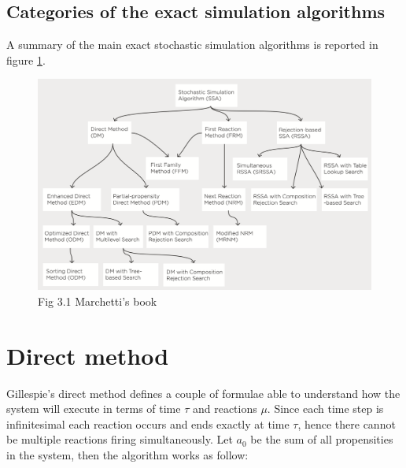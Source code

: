   \subsection{Categories of the exact simulation algorithms}
  A summary of the main exact stochastic simulation algorithms is reported in figure \ref{fig:tree}.

  \begin{figure}[H]
    \centering
    \includegraphics[width=\textwidth]{tree_methods.png}
    \caption{Fig 3.1 Marchetti's book}
    \label{fig:tree}
  \end{figure}

\section{Direct method}
Gillespie's direct method defines a couple of formulae able to understand how the system will execute in terms of time $\tau$ and reactions $\mu$.
Since each time step is infinitesimal each reaction occurs and ends exactly at time $\tau$, hence there cannot be multiple reactions firing simultaneously.
Let $a_0$ be the sum of all propensities in the system, then the algorithm works as follow:

